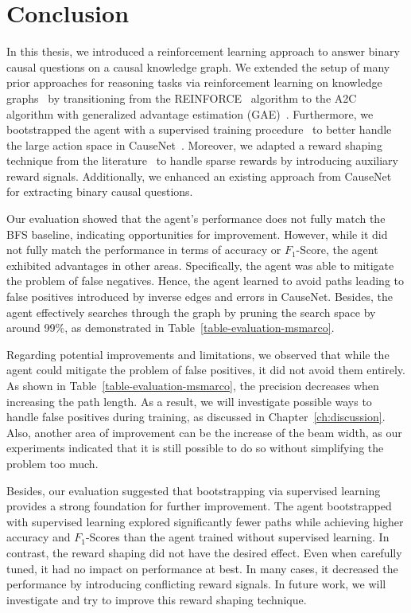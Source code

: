%
\chapter{Conclusion}
\label{ch:conclusion}

In this thesis, we introduced a reinforcement learning approach to answer binary causal questions 
on a causal knowledge graph. We extended the setup of many prior approaches for reasoning tasks
via reinforcement learning on knowledge graphs~\cite{Xiong2017DeePpath, Das2018Minerva, Qiu2020Stepwise, Kaiser2021Reinforcement} by transitioning from the REINFORCE~\cite{Williams1992REINFORCE} algorithm to the A2C~\cite{Mnih2016A2C} algorithm with 
generalized advantage estimation (GAE)~\cite{Schulman2016GAE}.
Furthermore, we bootstrapped the agent with a supervised training procedure~\cite{Xiong2017DeePpath} to better handle 
the large action space in CauseNet~\cite{Heindorf2020Causenet}.
Moreover, we adapted a reward shaping technique from the literature~\cite{Yasunaga2021QAGNN} to handle sparse rewards by introducing 
auxiliary reward signals.
Additionally, we enhanced an existing approach from CauseNet for extracting binary causal questions.

Our evaluation showed that the agent's performance does not fully match the BFS baseline, 
indicating opportunities for improvement. 
However, while it did not fully match the performance in terms of accuracy or $F_1$-Score, the agent exhibited advantages in other areas.
Specifically, the agent was able to mitigate the problem of false negatives. Hence, the agent learned to avoid paths leading to false positives introduced by inverse edges and errors in CauseNet. 
Besides, the agent effectively searches through the graph by pruning the search space by around 99\%, as demonstrated 
in Table~\ref{table-evaluation-msmarco}.

Regarding potential improvements and limitations, we observed that while the agent could mitigate the 
problem of false positives, it did not avoid them entirely. As shown in Table~\ref{table-evaluation-msmarco}, the 
precision decreases when increasing the path length. As a result, we will investigate possible ways to handle 
false positives during training, as discussed in Chapter~\ref{ch:discussion}. Also, another area of improvement can be 
the increase of the beam width, as our experiments indicated that it is still possible to do so without 
simplifying the problem too much.  

Besides, our evaluation suggested that bootstrapping via supervised learning provides a strong foundation for further improvement. 
The agent bootstrapped with supervised learning explored significantly fewer paths while achieving higher accuracy and $F_1$-Scores than the agent trained without supervised learning.
In contrast, the reward shaping did not have the desired effect. Even when carefully tuned, it had no impact on performance at best.
In many cases, it decreased the performance by introducing conflicting reward signals. In future work, we will investigate and try to improve this reward shaping technique.

